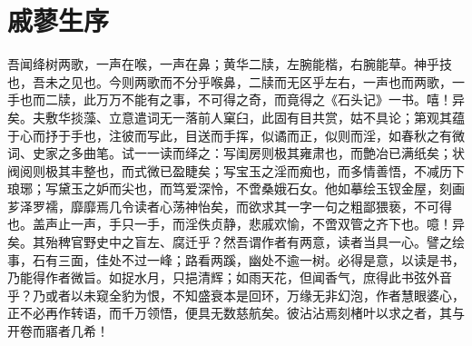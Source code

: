\chapter*{戚蓼生序}

\begin{qute2sp}

    \begin{parag}
        \Large
        吾闻绛树两歌，一声在喉，一声在鼻；黄华二牍，左腕能楷，右腕能草。神乎技也，吾未之见也。今则两歌而不分乎喉鼻，二牍而无区乎左右，一声也而两歌，一手也而二牍，此万万不能有之事，不可得之奇，而竟得之《石头记》一书。嘻！异矣。夫敷华掞藻、立意遣词无一落前人窠臼，此固有目共赏，姑不具论；第观其蕴于心而抒于手也，注彼而写此，目送而手挥，似谲而正，似则而淫，如春秋之有微词、史家之多曲笔。试一一读而绎之：写闺房则极其雍肃也，而艶冶已满纸矣；状阀阅则极其丰整也，而式微已盈睫矣；写宝玉之淫而痴也，而多情善悟，不减历下琅琊；写黛玉之妒而尖也，而笃爱深怜，不啻桑娥石女。他如摹绘玉钗金屋，刻画芗泽罗襦，靡靡焉几令读者心荡神怡矣，而欲求其一字一句之粗鄙猥亵，不可得也。盖声止一声，手只一手，而淫佚贞静，悲戚欢愉，不啻双管之齐下也。噫！异矣。其殆稗官野史中之盲左、腐迁乎？然吾谓作者有两意，读者当具一心。譬之绘事，石有三面，佳处不过一峰；路看两蹊，幽处不逾一树。必得是意，以读是书，乃能得作者微旨。如捉水月，只挹清辉；如雨天花，但闻香气，庶得此书弦外音乎？乃或者以未窥全豹为恨，不知盛衰本是回环，万缘无非幻泡，作者慧眼婆心，正不必再作转语，而千万领悟，便具无数慈航矣。彼沾沾焉刻楮叶以求之者，其与开卷而寤者几希！
    \end{parag}

\end{qute2sp}


